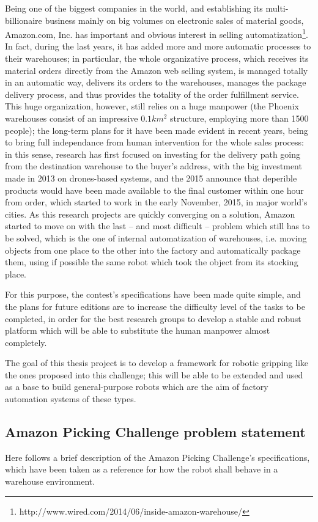 Being one of the biggest companies in the world, and establishing its
multi-billionaire business mainly on big volumes on electronic sales
of material goods, Amazon.com, Inc. has important and obvious interest
in selling automatization\footnote{http://www.wired.com/2014/06/inside-amazon-warehouse/}. In fact, during the last years, it has
added more and more automatic processes to their warehouses; in
particular, the whole organizative process, which receives its
material orders directly from the Amazon web selling system, is
managed totally in an automatic way, delivers its orders to the
warehouses, manages the package delivery process, and thus provides
the totality of the order fulfillment service. This huge organization,
however, still relies on a huge manpower (the Phoenix warehouses
consist of an impressive $0.1\unit{km^2}$ structure, employing more
than 1500 people); the long-term plans for it have been made evident
in recent years, being to bring full independance from human intervention for the whole
sales process: in this sense, research has first focused on investing
for the delivery path going from the destination warehouse to the
buyer's address, with the big investment made in 2013 on drones-based
systems, and the 2015 announce that deperible products would have been
made available to the final customer within one hour from order, which
started to work in the early November, 2015, in major world's
cities. As this research projects are quickly converging on a
solution, Amazon started to move on with the last -- and most
difficult -- problem which still has to be solved, which is the one of
internal automatization of warehouses, i.e. moving objects from one
place to the other into the factory and automatically package them,
using if possible the same robot which took the object from its
stocking place.

For this purpose, the contest's specifications have been made quite simple, and the plans
for future editions are to increase the difficulty level of the tasks
to be completed, in order for the best research groups to develop a
stable and robust platform which will be able to substitute the human
manpower almost completely.

The goal of this thesis project is to develop a framework for robotic
gripping like the ones proposed into this challenge; this will be able
to be extended and used as a base to build general-purpose robots
which are the aim of factory automation systems of these types.

\subsection{Amazon Picking Challenge problem statement} \label{sec:apc}
Here follows a brief description of the Amazon Picking Challenge's
specifications, which have been taken as a reference for how the robot
shall behave in a warehouse environment.

